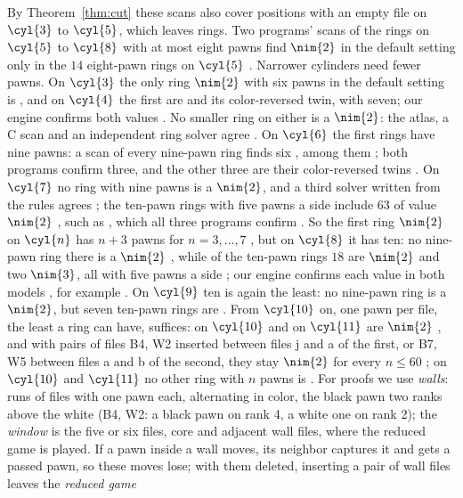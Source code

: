 By Theorem~\ref{thm:cut} these scans also cover positions with an empty file on $\cyl{3}$ to $\cyl{5}$, which
leaves rings. Two programs' scans of the rings on
$\cyl{5}$ to $\cyl{8}$ with at most eight pawns find $\nim{2}$ in the default setting only in the $14$
eight-pawn rings on $\cyl{5}$ . Narrower cylinders need fewer pawns. On $\cyl{3}$ the only ring
$\nim{2}$ with six pawns in the default setting is , and on $\cyl{4}$ the first
are  and its color-reversed twin, with seven; our engine confirms both values
. No smaller ring on either is a $\nim{2}$: the atlas, a C scan and an independent ring solver agree
. On $\cyl{6}$ the first rings have nine pawns: a scan of every
nine-pawn ring finds six , among them ; both programs confirm
three, and the other three are their color-reversed twins . On $\cyl{7}$ no ring with nine pawns is a
$\nim{2}$, and a third solver written from the rules agrees ; the ten-pawn rings with five pawns a side
include $63$ of value $\nim{2}$ , such as , which all three
programs confirm . So the first ring $\nim{2}$ on $\cyl{n}$ has $n+3$ pawns for $n=3,\dots,7$
, but on $\cyl{8}$ it has ten: no nine-pawn ring there is a $\nim{2}$ , while of the ten-pawn
rings $18$ are $\nim{2}$ and two $\nim{3}$, all with five pawns a side ; our engine
confirms each value in both models , for example . On $\cyl{9}$
ten is again the least: no nine-pawn ring is a $\nim{2}$, but seven ten-pawn rings are . From $\cyl{10}$ on, one pawn per file, the least a
ring can have, suffices:  on $\cyl{10}$ and  on $\cyl{11}$ are $\nim{2}$ , and with pairs of files B4, W2 inserted between files j and a
of the first, or B7, W5 between files a and b of the second, they stay $\nim{2}$ for every $n\le60$ ; on $\cyl{10}$ and $\cyl{11}$ no other ring with $n$ pawns is .
For proofs we use \emph{walls}: runs of files with one pawn each, alternating in color, the black pawn two
ranks above the white (B4, W2: a black pawn on rank 4, a white one on rank 2); the \emph{window} is the
five or six files, core and adjacent wall files, where the reduced game is played. If a pawn inside a wall moves, its neighbor captures it and gets a passed
pawn, so these moves lose; with them deleted, inserting a pair of wall files leaves the \emph{reduced game}
